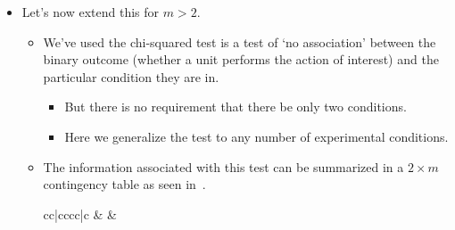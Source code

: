 \begin{itemize}
\begin{itemize}
\begin{table}[!htbp]
\begin{NiceTabular}{cc|cc|c}
                              \end{NiceTabular}
                        \end{table}
                  \item And the resultant test statistic and $p$-value are:
                        \[ t=\frac{(280-\num{343.9584332533972315105})^2}{\num{343.9584332533972315105}}
                        +\frac{(399-\num{335.0415667466027116461})^2}{\num{335.0415667466027116461}}
                        +\frac{(8592-\num{8528.041566746602256899})^2}{\num{8528.041566746602256899}}
                        +\frac{(8243-\num{8306.958433253397743101})^2}{\num{8306.958433253397743101}}=\num{25.07454026921025658226}    \]
                        \[ p\text{-value}=\Prob{T\ge \num{25.07454026921025658226}}=\num{5.515630872662529204161e-07}\quad\text{where }T \sim \chi^2(1) \]
            \end{itemize}
      \item Let's now extend this for $ m>2 $.
            \begin{itemize}
                  \item We've used the chi-squared test is a test of `no association' between the binary outcome (whether
                        a unit performs the action of interest) and the particular condition they are in.
                        \begin{itemize}
                              \item But there is no requirement that there be only two conditions.
                              \item Here we generalize the test to any number of experimental conditions.
                        \end{itemize}
                  \item The information associated with this test can be summarized in a $ 2\times m $ contingency table as seen in~.
                        \begin{table}[!htbp]
                              \centering
                              \caption{A General $ 2\times m $ Contingency Table}\label{general_2m_contingency}
                              \begin{NiceTabular}{cc|cccc|c}
                                            &  &                                                                                                                                           \\

\end{NiceTabular}
\end{table}
\end{itemize}
\end{itemize}
